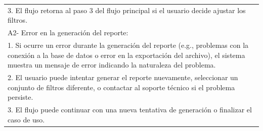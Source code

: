 \documentclass[stu, 12pt, letterpaper, donotrepeattitle, floatsintext, natbib]{apa7}
\begin{document}
\begin{longtable}{@{} p{16.5cm} @{}}
    \hspace{1cm}3. El flujo retorna al paso 3 del flujo principal si el usuario decide ajustar los filtros.                                                                                                                                                                    \\
    A2- Error en la generación del reporte:                                                                                                                                                                                                                                    \\
    \hspace{1cm}1. Si ocurre un error durante la generación del reporte (e.g., problemas con la conexión a la base de datos o error en la exportación del archivo), el sistema muestra un mensaje de error indicando la naturaleza del problema.                               \\
    \hspace{1cm}2. El usuario puede intentar generar el reporte nuevamente, seleccionar un conjunto de filtros diferente, o contactar al soporte técnico si el problema persiste.                                                                                              \\
    \hspace{1cm}3. El flujo puede continuar con una nueva tentativa de generación o finalizar el caso de uso.                                                                                                                                                                  \\ \bottomrule
\end{longtable}
\newpage
\end{document}
